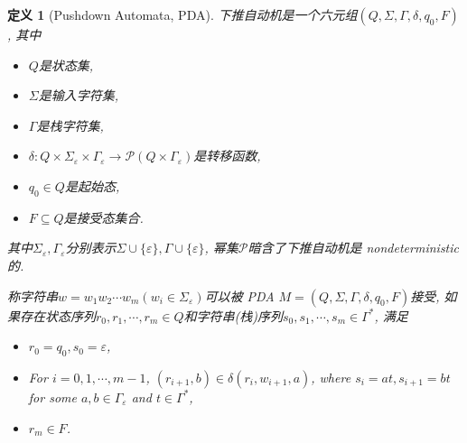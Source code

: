\documentclass[8pt]{article}
\theoremstyle{compact}
\newtheorem{definition}{定义}
\begin{document}
\begin{definition}[Pushdown Automata, PDA]
	下推自动机是一个六元组$(Q, \Sigma, \Gamma, \delta, q_0, F)$, 其中
	\begin{itemize}
		\item $Q$是状态集, 
		\item $\Sigma$是输入字符集, 
		\item $\Gamma$是栈字符集, 
		\item $\delta: Q \times \Sigma_{\varepsilon} \times \Gamma_{\varepsilon} \to \mathcal P(Q \times \Gamma_{\varepsilon})$是转移函数, 
		\item $q_0 \in Q$是起始态, 
		\item $F \subseteq Q$是接受态集合. 
	\end{itemize}

	其中$\Sigma_{\varepsilon}, \Gamma_{\varepsilon}$分别表示$\Sigma \cup \{\varepsilon\}, \Gamma \cup \{\varepsilon\}$, 幂集$\mathcal P$暗含了下推自动机是 nondeterministic 的. 

	称字符串$w = w_1w_2\cdots w_m(w_i \in \Sigma_{\varepsilon})$可以被 PDA $M = (Q, \Sigma, \Gamma, \delta, q_0, F)$接受, 如果存在状态序列$r_0, r_1, \cdots, r_m \in Q$和字符串(栈)序列$s_0, s_1, \cdots, s_m \in \Gamma^*$, 满足
	\begin{itemize}
		\item $r_0 = q_0, s_0 = \varepsilon$,
		\item For $i = 0, 1, \cdots, m-1$, $(r_{i+1}, b) \in \delta(r_i, w_{i+1}, a)$, where $s_i = at, s_{i+1}=bt$ for some $a, b \in \Gamma_{\varepsilon}$ and $t \in \Gamma^*$,
		\item $r_m \in F$.
	\end{itemize}
\end{definition}
\end{document}
